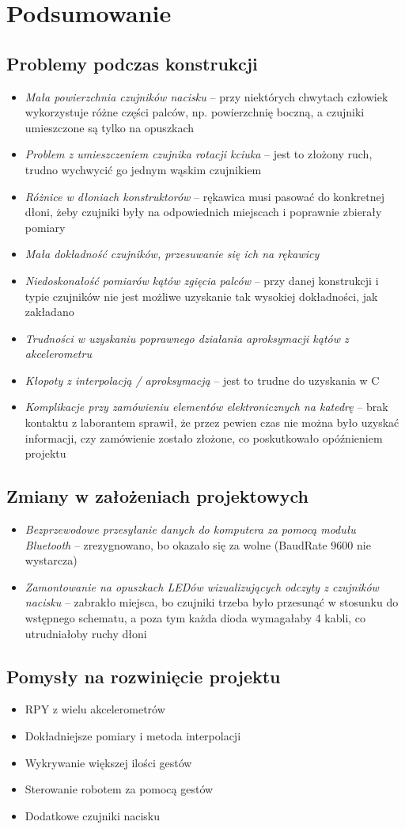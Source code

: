 \documentclass[12pt,a4paper]{article}
\begin{document}
\newpage
\section{Podsumowanie}
\subsection{Problemy podczas konstrukcji}
\begin{itemize}
\item \textit{Mała powierzchnia czujników nacisku} -- przy niektórych chwytach człowiek wykorzystuje różne części palców, np. powierzchnię boczną, a czujniki umieszczone są tylko na opuszkach
\item \textit{Problem z umieszczeniem czujnika rotacji kciuka} -- jest to złożony ruch, trudno wychwycić go jednym wąskim czujnikiem
\item \textit{Różnice w dłoniach konstruktorów} -- rękawica musi pasować do konkretnej dłoni, żeby czujniki były na odpowiednich miejscach i poprawnie zbierały pomiary
\item \textit{Mała dokładność czujników, przesuwanie się ich na rękawicy}
\item \textit{Niedoskonałość pomiarów kątów zgięcia palców} -- przy danej konstrukcji i typie czujników nie jest możliwe uzyskanie tak wysokiej dokładności, jak zakładano
\item \textit{Trudności w uzyskaniu poprawnego działania aproksymacji kątów z akcelerometru}
\item \textit{Kłopoty z interpolacją / aproksymacją} -- jest to trudne do uzyskania w C
\item \textit{Komplikacje przy zamówieniu elementów elektronicznych na katedrę} -- brak kontaktu z laborantem sprawił, że przez pewien czas nie można było uzyskać informacji, czy zamówienie zostało złożone, co poskutkowało opóźnieniem projektu
\end{itemize}
\subsection{Zmiany w założeniach projektowych}
\begin{itemize}
\item \textit{Bezprzewodowe przesyłanie danych do komputera za pomocą modułu Bluetooth} -- zrezygnowano, bo okazało się za wolne (BaudRate 9600 nie wystarcza)
\item \textit{Zamontowanie na opuszkach LEDów wizualizujących odczyty z czujników nacisku} -- zabrakło miejsca, bo czujniki trzeba było przesunąć w stosunku do wstępnego schematu, a poza tym każda dioda wymagałaby 4 kabli, co utrudniałoby ruchy dłoni
\end{itemize}
\subsection{Pomysły na rozwinięcie projektu}
\begin{itemize}
\item RPY z wielu akcelerometrów
\item Dokładniejsze pomiary i metoda interpolacji
\item Wykrywanie większej ilości gestów
\item Sterowanie robotem za pomocą gestów
\item Dodatkowe czujniki nacisku
\end{itemize}
\end{document}
